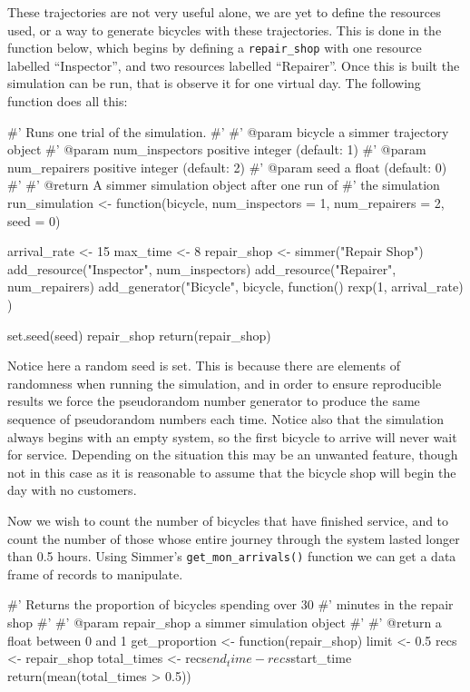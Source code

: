 These trajectories are not very useful alone, we are yet to define the resources
used, or a way to generate bicycles with these trajectories. This is done in the
function below, which begins by defining a \texttt{repair_shop} with one
resource labelled ``Inspector'', and two resources labelled ``Repairer''.
Once this is built the simulation can be run, that is observe it for one
virtual day. The following function does all this:

\begin{Rin}
#' Runs one trial of the simulation.
#'
#' @param bicycle a simmer trajectory object
#' @param num_inspectors positive integer (default: 1)
#' @param num_repairers positive integer (default: 2)
#' @param seed a float (default: 0)
#'
#' @return A simmer simulation object after one run of
#'         the simulation
run_simulation <- function(bicycle,
                           num_inspectors = 1,
                           num_repairers = 2,
                           seed = 0) {
  arrival_rate <- 15
  max_time <- 8
  repair_shop <-
    simmer("Repair Shop") %
    add_resource("Inspector", num_inspectors) %
    add_resource("Repairer", num_repairers) %
    add_generator("Bicycle", bicycle, function() {
      rexp(1, arrival_rate)
    })

  set.seed(seed)
  repair_shop %
  return(repair_shop)
}
\end{Rin}

Notice here a random seed is set. This is because there are elements of
randomness when running the simulation, and in order to ensure reproducible
results we force the pseudorandom number generator to produce the same sequence
of pseudorandom numbers each time.
Notice also that the simulation always begins with an empty system, so the first
bicycle to arrive will never wait for service. Depending on the situation this
may be an unwanted feature, though not in this case as it is reasonable to
assume that the bicycle shop will begin the day with no customers.

Now we wish to count the number of bicycles that have finished service, and to
count the number of those whose entire journey through the system lasted longer
than 0.5 hours. Using Simmer's \texttt{get_mon_arrivals()} function we
can get a data frame of records to manipulate.

\begin{Rin}
#' Returns the proportion of bicycles spending over 30
#' minutes in the repair shop
#'
#' @param repair_shop a simmer simulation object
#'
#' @return a float between 0 and 1
get_proportion <- function(repair_shop) {
  limit <- 0.5
  recs <- repair_shop %
  total_times <- recs$end_time - recs$start_time
  return(mean(total_times > 0.5))
}
\end{Rin}

